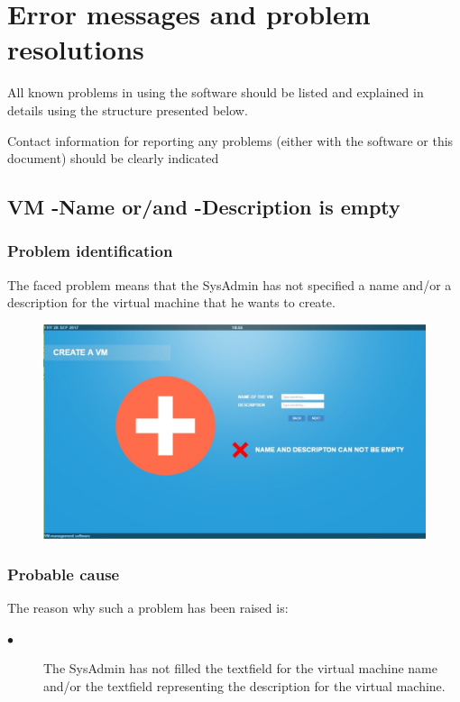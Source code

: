 
\chapter{Error messages and problem resolutions}
\label{chap:error_messages}

All known problems in using the software should be listed and explained in
details using the structure presented below.

Contact information for reporting any problems (either with the software or
this document) should be clearly indicated




\section{VM -Name or/and -Description is empty} 

\subsection{Problem identification}
The faced problem means that the SysAdmin has not specified a name and/or a
description for the virtual machine that he wants to create.

\begin{figure}[H]
\centering
\includegraphics[width=170mm]{images/namedescription.eps}
\caption{\label{overflow}}
\end{figure}

\subsection{Probable cause}

The reason why such a problem has been raised is:\\
\begin{description}
\item[$\bullet$] The SysAdmin has not filled the textfield for the virtual
machine name and/or the textfield representing the description for the virtual
machine.
\end{description}


